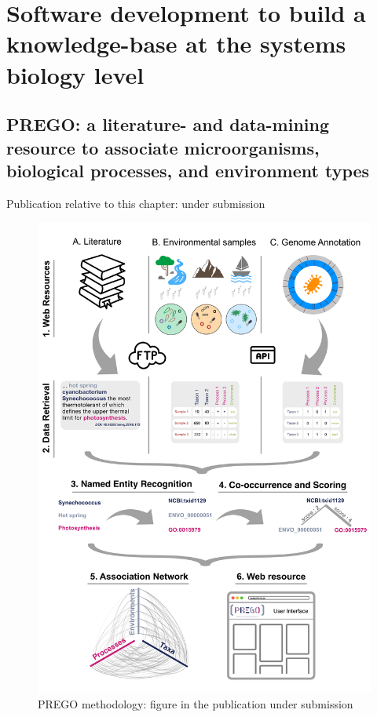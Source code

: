 % 
% 


\chapter{Software development to build a knowledge-base at the systems biology level}
\label{cha:prego}



\section{PREGO: a literature- and data-mining resource to associate microorganisms, biological processes, and environment types}

Publication relative to this chapter: under submission

\begin{figure}[!htbp]
   \centering
   \includegraphics[width=0.85\columnwidth]{figures/prego_analysis.png}
   \caption{PREGO methodology: figure in the publication under submission}
\end{figure}



